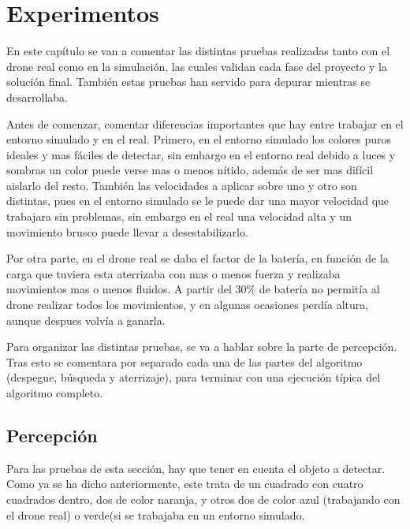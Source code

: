 \chapter{Experimentos}\label{cap.experimentos}
\hspace{1cm} En este cap\'itulo se van a comentar las distintas pruebas realizadas tanto con el drone real como en la simulaci\'on, las cuales validan cada fase del proyecto y la soluci\'on final. Tambi\'en estas pruebas han servido para depurar mientras se desarrollaba. 

\hspace{1cm} Antes de comenzar, comentar diferencias importantes que hay entre trabajar en el entorno simulado y en el real. Primero, en el entorno simulado los colores puros ideales y mas f\'aciles de detectar, sin embargo en el entorno real debido a luces y sombras un color puede verse mas o menos n\'itido, adem\'as de ser mas dif\'icil aislarlo del resto. Tambi\'en las velocidades a aplicar sobre uno y otro son distintas, pues en el entorno simulado se le puede dar una mayor velocidad que trabajara sin problemas, sin embargo en el real una velocidad alta y un movimiento brusco puede llevar a desestabilizarlo. 

\hspace{1cm} Por otra parte, en el drone real se daba el factor de la bater\'ia, en funci\'on de la carga que tuviera esta aterrizaba con mas o menos fuerza y realizaba movimientos mas o menos fluidos. A partir del 30\% de bater\'ia no permit\'ia al drone realizar todos los movimientos, y en algunas ocasiones perd\'ia altura, aunque despues volv\'ia a ganarla. 

\hspace{1cm} Para organizar las distintas pruebas,  se va a hablar sobre la parte de percepci\'on. Tras esto se comentara por separado cada una de las partes del algoritmo (despegue, b\'usqueda y aterrizaje), para terminar con una ejecuci\'on t\'ipica del algoritmo completo.

\section{Percepci\'on }\label{sec:percepcion}

\hspace{1cm} Para las pruebas de esta secci\'on, hay que tener en cuenta el objeto a detectar. Como ya se ha dicho anteriormente, este trata de un cuadrado con cuatro cuadrados dentro, dos de color naranja, y otros dos de color azul (trabajando con el drone real) o verde(si se trabajaba en un entorno simulado. 

